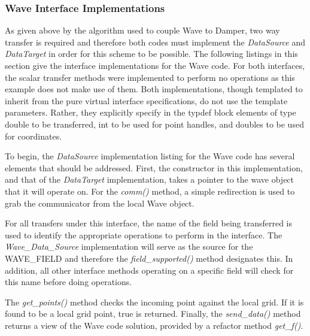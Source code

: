 \documentclass[letterpaper]{article}
\begin{document}
\subsubsection{Wave Interface Implementations}
As given above by the algorithm used to couple Wave to Damper, two way
transfer is required and therefore both codes must implement the {\sl
  DataSource} and {\sl DataTarget} in order for this scheme to be
possible. The following listings in this section give the interface
implementations for the Wave code. For both interfaces, the scalar
transfer methods were implemented to perform no operations as this
example does not make use of them. Both implementations, though
templated to inherit from the pure virtual interface specifications,
do not use the template parameters. Rather, they explicitly specify in
the typdef block elements of type double to be transferred, int to be
used for point handles, and doubles to be used for coordinates.

To begin, the {\sl DataSource} implementation listing for the Wave
code has several elements that should be addressed. First, the
constructor in this implementation, and that of the {\sl DataTarget}
implementation, takes a pointer to the wave object that it will
operate on. For the {\sl comm()} method, a simple redirection is used
to grab the communicator from the local Wave object. 

For all transfers under this interface, the name of the field being
transferred is used to identify the appropriate operations to perform
in the interface. The {\sl Wave\_Data\_Source} implementation will
serve as the source for the WAVE\_FIELD and therefore the {\sl
  field\_supported()} method designates this. In addition, all other
interface methods operating on a specific field will check for this
name before doing operations.

The {\sl get\_points()} method checks the incoming point against the
local grid. If it is found to be a local grid point, true is
returned. Finally, the {\sl send\_data()} method returns a view of the
Wave code solution, provided by a refactor method {\sl get\_f()}.
\end{document}
